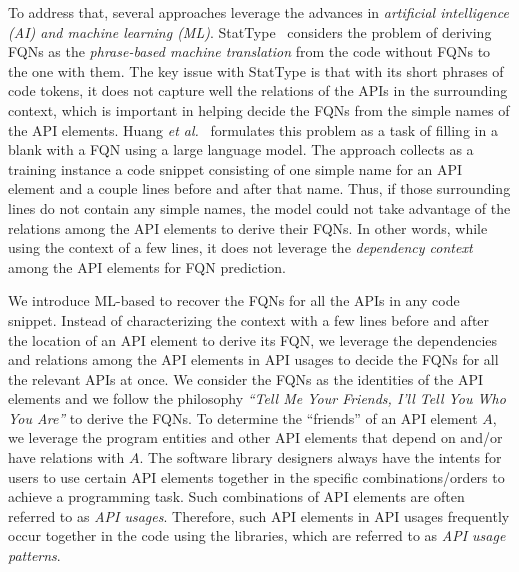 To address that, several approaches leverage the advances in {\em
  artificial intelligence (AI) and machine learning
  (ML)}. StatType~\cite{icse18} considers the problem of deriving FQNs
as the {\em phrase-based machine translation} from the code without
FQNs to the one with them. The key issue with StatType is that with
its short phrases of code tokens, it does not capture well the
relations of the APIs in the surrounding context, which is important
in helping decide the FQNs from the simple names of the API elements.
%
Huang {\em et al.}~\cite{prompt-ase22} formulates this problem as a
task of filling in a blank with a FQN using a large language model.
The approach collects as a training instance a code snippet consisting
of one simple name for an API element and a couple lines before and
after that name. Thus, if those surrounding lines do not contain any
simple names, the model could not take advantage of the relations
among the API elements to derive their FQNs. In other words, while
using the context of a few lines, it does not leverage the {\em
  dependency context} among the API elements for FQN prediction.


%

We introduce ML-based {\tool} to recover the FQNs for all the APIs in
any code snippet. Instead of characterizing the context with a few
lines before and after the location of an API element to derive its
FQN, we leverage the dependencies and relations among the API elements
in API usages to decide the FQNs for all the relevant APIs at once. We
consider the FQNs as the identities of the API elements and we follow
the philosophy {\em ``Tell Me Your Friends, I'll Tell You Who You
  Are''} to derive the FQNs. To determine the ``friends'' of an API
element $A$, we leverage the program entities and other API elements
that depend on and/or have relations with $A$. The software library
designers always have the intents for users to use certain API
elements together in the specific combinations/orders to achieve a
programming task. Such combinations of API elements are often referred
to as {\em API usages}. Therefore, such API elements in API usages
frequently occur together in the code using the libraries, which are
referred to as {\em API usage patterns}.

